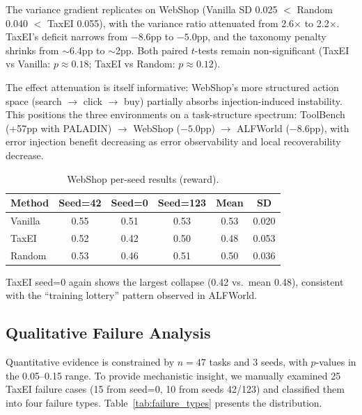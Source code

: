\documentclass[11pt,a4paper]{article}
\begin{document}
The variance gradient replicates on WebShop (Vanilla SD 0.025 $<$ Random 0.040 $<$ TaxEI 0.055), with the variance ratio attenuated from 2.6$\times$ to 2.2$\times$. TaxEI's deficit narrows from $-8.6$pp to $-5.0$pp, and the taxonomy penalty shrinks from $\sim$6.4pp to $\sim$2pp. Both paired $t$-tests remain non-significant (TaxEI vs Vanilla: $p \approx 0.18$; TaxEI vs Random: $p \approx 0.12$).

The effect attenuation is itself informative: WebShop's more structured action space (search $\rightarrow$ click $\rightarrow$ buy) partially absorbs injection-induced instability. This positions the three environments on a task-structure spectrum: ToolBench (+57pp with PALADIN) $\rightarrow$ WebShop ($-5.0$pp) $\rightarrow$ ALFWorld ($-8.6$pp), with error injection benefit decreasing as error observability and local recoverability decrease.

\begin{table}[t]
\centering
\small
\caption{WebShop per-seed results (reward).}
\label{tab:webshop_seeds}
\begin{tabular}{lccccc}
\toprule
\textbf{Method} & \textbf{Seed=42} & \textbf{Seed=0} & \textbf{Seed=123} & \textbf{Mean} & \textbf{SD} \\
\midrule
Vanilla & 0.55 & 0.51 & 0.53 & 0.53 & 0.020 \\
TaxEI & 0.52 & 0.42 & 0.50 & 0.48 & 0.053 \\
Random & 0.53 & 0.46 & 0.51 & 0.50 & 0.036 \\
\bottomrule
\end{tabular}
\end{table}

TaxEI seed=0 again shows the largest collapse (0.42 vs.\ mean 0.48), consistent with the ``training lottery'' pattern observed in ALFWorld.

\subsection{Qualitative Failure Analysis}
\label{sec:qualitative}

Quantitative evidence is constrained by $n=47$ tasks and 3 seeds, with $p$-values in the 0.05--0.15 range. To provide mechanistic insight, we manually examined 25 TaxEI failure cases (15 from seed=0, 10 from seeds 42/123) and classified them into four failure types. Table~\ref{tab:failure_types} presents the distribution.
\end{document}
